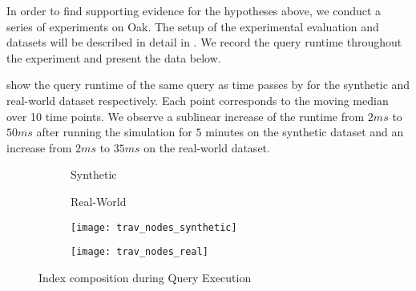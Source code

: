 \documentclass[abstracton,12pt]{scrartcl}
\theoremstyle{definition}
\begin{document}


In order to find supporting evidence for the hypotheses above, we conduct a series of
experiments on Oak. The setup of the  experimental evaluation and
datasets will be described in detail in . We
record the query runtime throughout the experiment and present the data below.

 show the 
query runtime of the same query as time passes by for the synthetic and
real-world dataset respectively. 
Each point corresponds to the moving median over 10 time points.
We observe a sublinear increase of the runtime from $2 ms$ to $50 ms$
after running the simulation for $5$ minutes
on the synthetic dataset and an increase from $2 ms$ to $35 ms$ on the
real-world dataset. 

\begin{figure}[!ht]
  \centering
  \begin{subfigure}{0.49\linewidth}
    \centering
    Synthetic
  \end{subfigure}
  \begin{subfigure}{0.49\linewidth}
    \centering
    Real-World
  \end{subfigure}
  \begin{subfigure}{0.49\linewidth}
    \centering
    \texttt{[image: trav\_nodes\_synthetic]}
    \caption{}
    \label{fig:trav_nodes_synthetic}
  \end{subfigure}
  \begin{subfigure}{0.49\linewidth}
    \centering
    \texttt{[image: trav\_nodes\_real]}
    \caption{}
    \label{fig:trav_nodes_real}
  \end{subfigure}
  \caption{Index composition during Query Execution}
  \label{fig:trav_nodes}
\end{figure}
\end{document}

